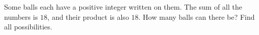 Some balls each have a positive integer written on them. The sum of all the numbers is $18$, and their product is also $18$. How many balls can there be? Find all possibilities.
